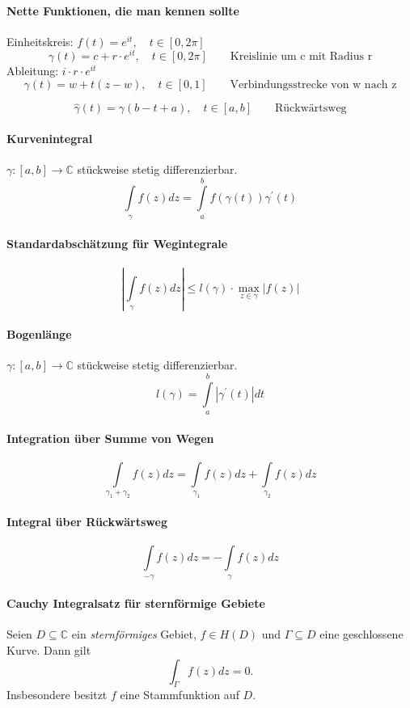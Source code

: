 \documentclass[a4paper, 10pt, DIV20, headings=small]{scrartcl}
\theoremstyle{definition}
\theoremstyle{plain}
\begin{document}
\paragraph{Nette Funktionen, die man kennen sollte}
Einheitskreis: $f(t)=e^{it}, \quad t \in [0,2\pi]$
$$\gamma(t) = c + r \cdot e^{it}, \quad t \in [0,2\pi] \qquad \text{Kreislinie um c mit Radius r}$$ Ableitung: $i \cdot r \cdot e^{it}$
$$\gamma(t) =w+ t(z-w), \quad t \in [0,1] \qquad \text{Verbindungsstrecke von w nach z}$$

$$\hat{\gamma}(t) = \gamma(b-t+a), \quad t \in [a,b] \qquad \text{Rückwärtsweg}$$

\paragraph{Kurvenintegral}
$\gamma \colon [a,b] \rightarrow \mathbb{C}$ stückweise stetig differenzierbar.
$$\int\limits_{\gamma} f(z) dz = \int\limits_{a}^{b}{f(\gamma(t)) \gamma^\prime(t)}$$

\paragraph{Standardabschätzung für Wegintegrale}
$$\left|\int\limits_{\gamma} f(z) dz \right| \leq l(\gamma) \cdot \max\limits_{z \in \gamma} |f(z)|$$

\paragraph{Bogenlänge}
$\gamma \colon [a,b] \rightarrow \mathbb{C}$ stückweise stetig differenzierbar.
$$l(\gamma) = \int\limits_a^b{|\gamma^\prime (t)| dt}$$

\paragraph{Integration über Summe von Wegen}
$$\int\limits_{\gamma_1 + \gamma_2}f(z) dz = \int\limits_{\gamma_1}f(z) dz + \int\limits_{\gamma_2}f(z) dz$$

\paragraph{Integral über Rückwärtsweg}
$$\int\limits_{-\gamma}f(z)dz = - \int \limits_{\gamma} f(z) dz$$

\paragraph{Cauchy Integralsatz für sternförmige Gebiete}
Seien $D \subseteq \mathbb{C}$ ein \emph{sternförmiges} Gebiet, $f \in H(D)$ und $\Gamma \subseteq D$ eine geschlossene Kurve. Dann gilt
$$\int_\Gamma f(z) dz = 0.$$ Insbesondere besitzt $f$ eine Stammfunktion auf $D$.
\end{document}
